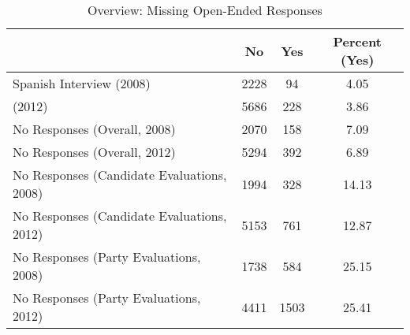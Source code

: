 \begin{table}[ht]
\centering
\begin{tabular}{lccc}
  \hline
 & No & Yes & Percent (Yes) \\ 
  \hline
Spanish Interview (2008) & 2228 & 94 & 4.05 \\ 
  (2012) & 5686 & 228 & 3.86 \\ 
  No Responses (Overall, 2008) & 2070 & 158 & 7.09 \\ 
  No Responses (Overall, 2012) & 5294 & 392 & 6.89 \\ 
  No Responses (Candidate Evaluations, 2008) & 1994 & 328 & 14.13 \\ 
  No Responses (Candidate Evaluations, 2012) & 5153 & 761 & 12.87 \\ 
  No Responses (Party Evaluations, 2008) & 1738 & 584 & 25.15 \\ 
  No Responses (Party Evaluations, 2012) & 4411 & 1503 & 25.41 \\ 
   \hline
\end{tabular}
\caption{Overview: Missing Open-Ended Responses} 
\label{tab:a1_mis}
\end{table}
